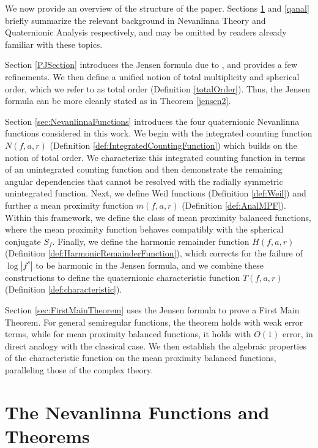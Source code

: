 \documentclass{amsart}
\begin{document}
We now provide an overview of the structure of the paper. Sections \ref{sec:Nevanlinna} and \ref{qanal} briefly summarize the relevant background in Nevanlinna Theory and Quaternionic Analysis respectively, and may be omitted by readers already familiar with these topics.

Section \ref{PJSection} introduces the Jensen formula due to \cite{perottiJensen2019}, and provides a few refinements. We then define a unified notion of total multiplicity and spherical order, which we refer to as total order (Definition \ref{totalOrder}). Thus, the Jensen formula can be more cleanly stated as in Theorem \ref{jensen2}.

Section \ref{sec:NevanlinnaFunctions} introduces the four quaternionic Nevanlinna functions considered in this work. We begin with the integrated counting function $N(f,a,r)$ (Definition \ref{def:IntegratedCountingFunction}) which builds on the notion of total order. We characterize this integrated counting function in terms of an unintegrated counting function and then demonstrate the remaining angular dependencies that cannot be resolved with the radially symmetric unintegrated function. Next, we define Weil functions (Definition \ref{def:Weil}) and further a mean proximity function $m(f,a,r)$ (Definition \ref{def:AnalMPF}). Within this framework, we define the class of mean proximity balanced functions, where the mean proximity function behaves compatibly with the spherical conjugate $S_f$. Finally, we define the harmonic remainder function $H(f,a,r)$ (Definition \ref{def:HarmonicRemainderFunction}), which corrects for the failure of $\log|f^s|$ to be harmonic in the Jensen formula, and we combine these constructions to define the quaternionic characteristic function $T(f,a,r)$ (Definition \ref{def:characteristic}). 

Section \ref{sec:FirstMainTheorem} uses the Jensen formula to prove a First Main Theorem. For general semiregular functions, the theorem holds with weak error terms, while for mean proximity balanced functions, it holds with $O(1)$ error, in direct analogy with the classical case. We then establish the algebraic properties of the characteristic function on the mean proximity balanced functions, paralleling those of the complex theory. 

\section{The Nevanlinna Functions and Theorems}\label{sec:Nevanlinna}
\end{document}
